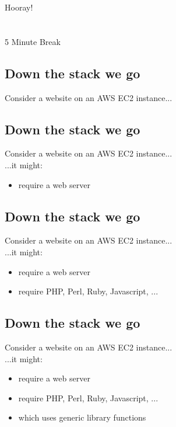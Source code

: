 \documentclass[xga]{xdvislides}
\begin{document}
\newpage
\vspace*{\fill}
\begin{center}
    \Hugesize
        Hooray! \\ [1em]
    \hspace*{5mm}
    \blueline\\
    \hspace*{5mm}\\
        5 Minute Break
\end{center}
\vspace*{\fill}

\subsection{Down the stack we go}
Consider a website on an AWS EC2 instance...

\subsection{Down the stack we go}
Consider a website on an AWS EC2 instance...
\\

...it might:

\begin{itemize}
	\item require a web server
\end{itemize}


\subsection{Down the stack we go}
Consider a website on an AWS EC2 instance...
\\

...it might:

\begin{itemize}
	\item require a web server
	\item require PHP, Perl, Ruby, Javascript, ...
\end{itemize}

\subsection{Down the stack we go}
Consider a website on an AWS EC2 instance...
\\

...it might:

\begin{itemize}
	\item require a web server
	\item require PHP, Perl, Ruby, Javascript, ...
	\item which uses generic library functions
\end{itemize}
\end{document}
